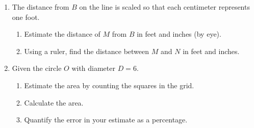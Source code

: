 \documentclass[12pt, twoside]{article}
\begin{document}
\begin{enumerate}
  \item The distance from $B$ on the line is scaled so that each centimeter represents one foot. \\[15pt] %
  \begin{enumerate}
    \item Estimate the distance of $M$ from $B$ in feet and inches (by eye). \vspace{1cm} 
    \item Using a ruler, find the distance between $M$ and $N$ in feet and inches. 
  \end{enumerate} \vspace{2cm}

  \item Given the circle $O$ with diameter $D=6$.
  \begin{multicols}{2}
    \begin{enumerate}[itemsep=1.5cm]
      \item Estimate the area by counting the squares in the grid.
      \item Calculate the area. 
      \item Quantify the error in your estimate as a percentage.
    \end{enumerate}
  \end{multicols}


\end{enumerate}
\end{document}
